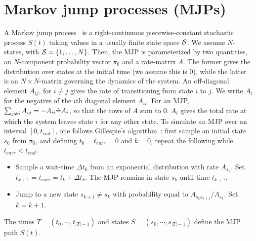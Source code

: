 \section{Markov jump processes (MJPs)} 
A Markov jump process~\cite{Cinlar1975} is a right-continuous 
piecewise-constant stochastic process $S(t)$ taking values in a 
usually finite state space ${\mathcal S}$. %
We assume $N$-states, with ${\mathcal S} = \{1,\ldots,N\}$. Then, 
the MJP is parameterized by two quantities, an $N$-component probability vector 
$\pi_0$ and a rate-matrix $A$. The former gives the distribution over states at 
the initial time (we assume this is $0$), while 
the latter is an $N \times N$-matrix governing the dynamics of the system.  An 
off-diagonal element $A_{ij}$, for $i \neq j$ gives the rate 
of transitioning from state $i$ to $j$. We write $A_i$ for the 
negative of the $i$th diagonal element $A_{ii}$. For an MJP,
$\sum_{j \neq i} A_{ij} = -A_{ii} {\doteq} A_i$, so that the rows of $A$ sum to $0$.  
$A_i$ gives the total rate at which the system leaves state $i$ for any other state.
To simulate an MJP over an interval $[0,t_{end}]$, one follows 
Gillespie's algorithm~\cite{gillespie97}: 
first sample an initial state $s_0$ from $\pi_0$, and
defining $t_0 = t_{curr} = 0$ and $k = 0$, repeat the following while
$t_{curr} < t_{end}$:
\begin{itemize}
  \item Sample a wait-time $\Delta t_k$ from an exponential distribution with rate 
    $A_{s_k}$.  Set $t_{k+1} = t_{curr} = t_{k} + \Delta t_k$.
    The MJP remains in state $s_k$ until time $t_{k+1}$.
  \item Jump to a new state $s_{k+1} \neq s_k$ with 
    probability equal to $A_{s_ks_{k+1}}/A_{s_k}$. Set $k=k+1$.
\end{itemize}
The times $T=(t_0, \cdots, t_{|T| - 1})$ and states 
$S=(s_0, \cdots, s_{|T| - 1 })$ define the MJP path $S(t)$.

